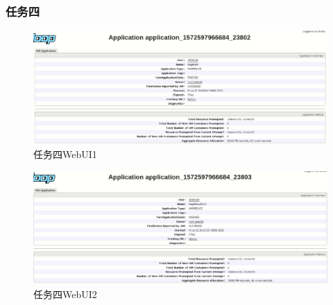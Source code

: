 \documentclass[a4paper,UTF8]{article}
\numberwithin{equation}{section}
\begin{document}
\subsubsection{任务四}
\begin{figure}[H]
    \centering
    \includegraphics[width = 15cm]{task4-1-success.png}
    \caption{任务四WebUI1}
\end{figure}
\begin{figure}[H]
    \centering
    \includegraphics[width = 15cm]{task4-2-success.png}
    \caption{任务四WebUI2}
\end{figure}
\end{document}
